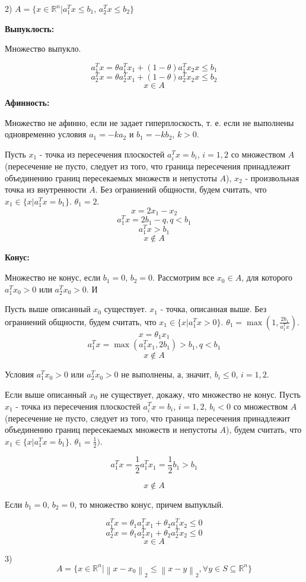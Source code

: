 \documentclass[12pt]{article}
\newcommand\norm[1]{\left\lVert#1\right\rVert}
\begin{document}
2) $A=\{x\in\mathbb{R}^n|a_1^Tx\leq b_1,\,a_2^Tx\leq b_2\}$

\textbf{Выпуклость:}

Множество выпукло.

$$a_1^Tx = \theta a_1^Tx_1 + (1-\theta)a_1^Tx_2x\leq b_1$$
$$a_2^Tx = \theta a_2^Tx_1 + (1-\theta)a_2^Tx_2x\leq b_2$$
$$x\in A$$

\textbf{Афинность:}

Множество не афинно, если не задает гиперплоскость, т. е. если не выполнены одновременно условия $a_1=-ka_2$ и $b_1 = -kb_2$, $k>0$.

Пусть $x_1$ - точка из пересечения плоскостей $a_i^Tx=b_i$, $i = 1, 2$ со множеством $A$(пересечение не пусто, следует из того, что граница пересечения принадлежит объединению границ пересекаемых множеств и непустоты $A$), $x_2$ - произвольная точка из внутренности $A$. Без ограниений общности, будем считать, что $x_1\in\{x|a_1^Tx= b_1\}$. $\theta_1 =2$.
$$x = 2x_1 - x_2$$
$$a_1^Tx = 2b_1- q, q<b_1$$
$$a_1^Tx> b_1$$
$$x\notin A$$

\textbf{Конус:}

Множество не конус, если $b_1 = 0,\,b_2=0$.
Рассмотрим все $x_0 \in A$, для которого $a_1^Tx_0 > 0$ или $a_2^Tx_0 > 0$. И

Пусть выше описанный $x_0$ существует. $x_1$ - точка, описанная выше. Без ограниений общности, будем считать, что $x_1\in\{x|a_1^Tx>0\}$. $\theta_1 =\max{(1, \frac{2b_1}{a_1^Tx})}$.
$$x = \theta_1x_1$$
$$a_1^Tx = \max{(a_1^Tx_1, 2b_1)} > b_1, q<b_1$$
$$x\notin A$$

Условия $a_1^Tx_0 > 0$ или $a_2^Tx_0 > 0$ не выполнены, а, значит, $b_i\leq 0$, $i=1,2$.

Если выше описанный $x_0$ не существует, докажу, что множество не конус. Пусть $x_1$ - точка из пересечения плоскостей $a_i^Tx=b_i$, $i = 1, 2$, $b_i<0$ со множеством $A$(пересечение не пусто, следует из того, что граница пересечения принадлежит объединению границ пересекаемых множеств и непустоты $A$), будем считать, что $x_1\in\{x|a_1^Tx= b_1\}$. $\theta_1 =\frac{1}{2})$.

$$a_1^Tx=\frac{1}{2}a_1^Tx_1=\frac{1}{2}b_1> b_1$$

$$x\notin A$$

Если $b_1 = 0,\,b_2=0$, то множество конус, причем выпуклый.

$$a_1^Tx = \theta_1 a_1^Tx_1 + \theta_2 a_1^Tx_2 \leq 0$$
$$a_2^Tx = \theta_1 a_2^Tx_1 + \theta_2 a_2^Tx_2 \leq 0$$
$$x\in A$$

3) $$A=\{x\in\mathbb{R}^n|\norm{x-x_0}_2\leq\norm{x-y}_2, \forall y\in S\subseteq \mathbb{R}^n\}$$
\end{document}
